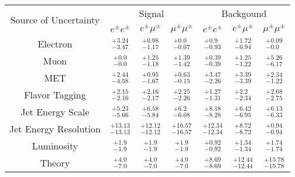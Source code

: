 
\renewcommand{\arraystretch}{1.5}
\begin{tabular}{c||ccc|ccc}
\hline
\multirow{2}{*}{Source of Uncertainty} & \multicolumn{3}{|c|}{Signal} & \multicolumn{3}{c}{Backgound} \\
        &$e^\pm e^\pm$ &$e^\pm \mu^\pm$ &$\mu^\pm \mu^\pm$ &$e^\pm e^\pm$ &$e^\pm \mu^\pm$ &$\mu^\pm \mu^\pm$ \\ \hline  \hline
Electron  &$^{+3.24}_{-3.47}$  &$^{+0.98}_{-1.17}$  &$^{+0.0}_{-0.07}$  &$^{+0.9}_{-0.93}$  &$^{+1.72}_{-0.94}$  &$^{+0.09}_{-0.0}$\\
Muon  &$^{+0.0}_{-0.0}$  &$^{+1.25}_{-1.18}$  &$^{+1.39}_{-1.42}$  &$^{+0.39}_{-0.39}$  &$^{+1.25}_{-1.22}$  &$^{+5.26}_{-6.17}$\\
MET  &$^{+2.44}_{-4.58}$  &$^{+0.95}_{-1.67}$  &$^{+0.63}_{-0.15}$  &$^{+3.47}_{-2.26}$  &$^{+3.39}_{-3.39}$  &$^{+2.34}_{-1.22}$\\
Flavor Tagging  &$^{+2.15}_{-2.16}$  &$^{+2.16}_{-2.17}$  &$^{+2.25}_{-2.26}$  &$^{+1.27}_{-1.31}$  &$^{+2.2}_{-2.34}$  &$^{+2.68}_{-2.75}$\\
Jet Energy Scale  &$^{+5.23}_{-5.66}$  &$^{+6.58}_{-5.84}$  &$^{+6.2}_{-6.08}$  &$^{+8.18}_{-8.28}$  &$^{+6.42}_{-6.95}$  &$^{+6.13}_{-6.33}$\\
Jet Energy Resolution  &$^{+13.13}_{-13.13}$  &$^{+12.12}_{-12.12}$  &$^{+16.57}_{-16.57}$  &$^{+12.34}_{-12.34}$  &$^{+8.72}_{-8.72}$  &$^{+0.94}_{-0.94}$\\
Luminosity  &$^{+1.9}_{-1.9}$  &$^{+1.9}_{-1.9}$  &$^{+1.9}_{-1.9}$  &$^{+0.92}_{-0.92}$  &$^{+1.34}_{-1.34}$  &$^{+1.74}_{-1.74}$\\
Theory  &$^{+4.0}_{-7.0}$  &$^{+4.0}_{-7.0}$  &$^{+4.0}_{-7.0}$  &$^{+8.69}_{-8.69}$  &$^{+12.44}_{-12.44}$  &$^{+15.78}_{-15.78}$\\
\hline\hline 
\end{tabular}

